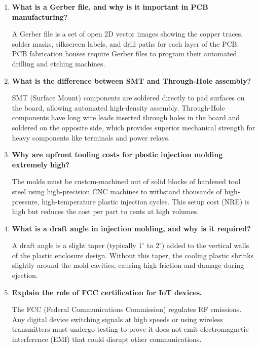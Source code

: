 \documentclass[12pt,a4paper]{article}
\newcommand{\Q}[1]{\textbf{#1}\par\noindent\ignorespaces}
\begin{document}
\vspace{6pt}

\begin{tcolorbox}[exambox, title={\textbf{Frequently Asked / Viva Questions}}]
\begin{enumerate}[leftmargin=*, topsep=0pt, label=\textbf{Q\arabic*.}, itemsep=6pt]
  \item \Q{What is a Gerber file, and why is it important in PCB manufacturing?}
        A Gerber file is a set of open 2D vector images showing the copper traces, solder masks, silkscreen labels, and drill paths for each layer of the PCB. PCB fabrication houses require Gerber files to program their automated drilling and etching machines.
        
  \item \Q{What is the difference between SMT and Through-Hole assembly?}
        SMT (Surface Mount) components are soldered directly to pad surfaces on the board, allowing automated high-density assembly. Through-Hole components have long wire leads inserted through holes in the board and soldered on the opposite side, which provides superior mechanical strength for heavy components like terminals and power relays.
        
  \item \Q{Why are upfront tooling costs for plastic injection molding extremely high?}
        The molds must be custom-machined out of solid blocks of hardened tool steel using high-precision CNC machines to withstand thousands of high-pressure, high-temperature plastic injection cycles. This setup cost (NRE) is high but reduces the cost per part to cents at high volumes.
        
  \item \Q{What is a draft angle in injection molding, and why is it required?}
        A draft angle is a slight taper (typically $1^\circ$ to $2^\circ$) added to the vertical walls of the plastic enclosure design. Without this taper, the cooling plastic shrinks slightly around the mold cavities, causing high friction and damage during ejection.
        
  \item \Q{Explain the role of FCC certification for IoT devices.}
        The FCC (Federal Communications Commission) regulates RF emissions. Any digital device switching signals at high speeds or using wireless transmitters must undergo testing to prove it does not emit electromagnetic interference (EMI) that could disrupt other communications.
        

\end{enumerate}
\end{tcolorbox}
\end{document}
